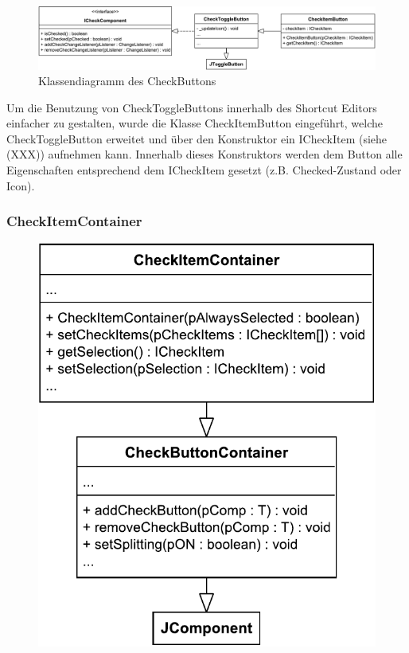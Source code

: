\begin{figure}[H]
	\centering
	\includegraphics[width=1\linewidth]{../graphic/diagrams/CD_CheckButton/CD_CheckButton}
	\caption{Klassendiagramm des CheckButtons}
	\label{fig:cdcheckbutton}
\end{figure}

Um die Benutzung von CheckToggleButtons innerhalb des Shortcut Editors einfacher zu gestalten, wurde die Klasse CheckItemButton eingeführt, welche CheckToggleButton erweitet und über den Konstruktor ein ICheckItem (siehe (XXX)) aufnehmen kann. Innerhalb dieses Konstruktors werden dem Button alle Eigenschaften entsprechend dem ICheckItem gesetzt (z.B. Checked-Zustand oder Icon).

\subsubsection{CheckItemContainer}

\begin{figure}
	\vspace{-12px}
	\centering
	\includegraphics[width=.95\linewidth]{../graphic/diagrams/CD_CheckItemContainer/CD_CheckItemContainer}
	\caption{}
	\label{fig:cdcheckitemcontainer}
\end{figure}

